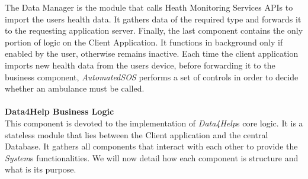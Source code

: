 \documentclass[titlepage]{article}
\begin{document}
	The Data Manager is the module that calls Heath Monitoring Services APIs to import the user\textsc{}s health data. It gathers data of the required type and forwards it to the requesting application server.
	Finally, the last component contains the only portion of logic on the Client Application. It functions in background only if enabled by the user, otherwise remains inactive. Each time the client application imports new health data from the user\textsc{}s device, before forwarding it to the business component, {\it AutomatedSOS} performs a set of controls in order to decide whether an ambulance must be called. \\ \\
	{\bf Data4Help Business Logic }\\ 
	This component is devoted to the implementation of {\it Data4Help}\textsc{}s core logic. It is a stateless module that lies between the Client application and the central Database. It gathers all components that interact with each other to provide the {\it System}\textsc{}s functionalities. We will now detail how each component is structure and what is its purpose.
\end{document}
